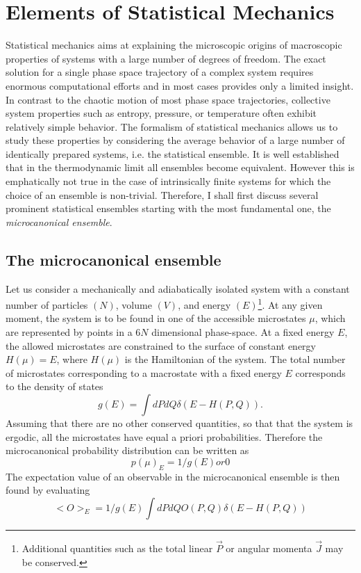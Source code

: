 \documentclass[12pt]{report}
\begin{document}
\chapter{Elements of Statistical Mechanics}
Statistical mechanics aims at explaining the microscopic origins of macroscopic properties of systems with a large number of degrees of freedom. The exact solution for a single phase space trajectory of a complex system requires enormous computational efforts and in most cases provides only a limited insight. In contrast to the chaotic motion of most phase space trajectories, collective system properties such as entropy, pressure, or temperature often exhibit relatively simple behavior. The formalism of statistical mechanics allows us to study these properties by considering the average behavior of a large number of identically prepared systems, i.e. the statistical ensemble. It is well established that in the thermodynamic limit all ensembles become equivalent. However this is emphatically not true in the case of intrinsically finite systems for which the choice of an ensemble is non-trivial. Therefore, I shall first discuss several prominent statistical ensembles starting with the most fundamental one, the \textit{microcanonical ensemble}.

\section{The microcanonical ensemble}
Let us consider a mechanically and adiabatically isolated system with a constant number of particles $(N)$, volume $(V)$, and energy $(E)$\footnote{Additional quantities such as the total linear $\vec{P}$ or angular momenta $\vec{J}$ may be conserved.}. At any given moment, the system is to be found in one of the accessible microstates $\mu$, which are represented by points in a $6N$ dimensional phase-space. At a fixed energy $E$, the allowed microstates are constrained to the surface of constant energy $H(\mu) = E$, where $H(\mu)$ is the Hamiltonian of the system. The total number of microstates corresponding to a macrostate with a fixed energy $E$ corresponds to the density of states
\begin{equation}
g(E) = \int dPdQ \delta(E - H(P,Q)).
\end{equation} 
Assuming that there are no other conserved quantities, so that that the system is ergodic, all the microstates have equal a priori probabilities. Therefore the microcanonical probability distribution can be written as 
\begin{equation}
p(\mu)_{E} = 1/g(E) or 0
\end{equation}
The expectation value of an observable in the microcanonical ensemble is then found by evaluating
\begin{equation}
<O>_{E} = 1/g(E)\int dPdQ  O(P,Q)\delta(E - H(P,Q))
\end{equation}
\end{document}
